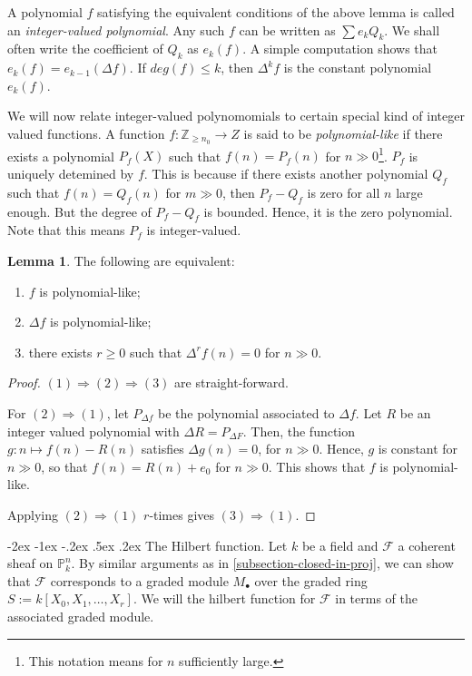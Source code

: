 \documentclass[11pt]{amsart}
\makeatletter
\renewcommand\subsection{\@startsection {subsection}{1}{\z@}%
	{-2ex \@plus -1ex \@minus -.2ex}%
	{.5ex \@plus.2ex}%
	{\normalfont\bfseries}}
\newcommand{\sF}{{\mathcal F}}
\renewcommand{\P}{{\mathbb P}}
\newcommand{\Z}{{\mathbb Z}}
\theoremstyle{definition}
\newtheorem{lemma}[theorem]{Lemma}
\makeatother
\begin{document}
A polynomial $f$ satisfying the equivalent conditions of the above lemma is called an \textit{integer-valued polynomial}. Any such $f$ can be written as $\sum e_k Q_k$. We shall often write the coefficient of $Q_k$ as $e_k(f)$. A simple computation shows that $e_k(f)= e_{k-1}(\Delta f)$. If $deg(f)\leq k$, then $\Delta^k f$ is the constant polynomial $e_k(f)$.

We will now relate integer-valued polynomomials to certain special kind of integer valued functions. A function $f:\Z_{\geq n_0}\rightarrow Z$ is said to be \textit{polynomial-like} if there exists a polynomial $P_f(X)$ such that $f(n)=P_f(n)$ for $n\gg0$\footnote{This notation means for $n$ sufficiently large.}. $P_f$ is uniquely detemined by $f$. This is because if there exists another polynomial $Q_f$ such that $f(n)=Q_f(n)$ for $m\gg 0$, then $P_f-Q_f$ is zero for all $n$ large enough. But the degree of $P_f-Q_f$ is bounded. Hence, it is the zero polynomial. Note that this means $P_f$ is integer-valued.

\begin{lemma}
	\label{lemma-polynomial-like-function}
	The following are equivalent:
	\begin{enumerate}
		\item $f$ is polynomial-like;
		\item $\Delta f$ is polynomial-like;
		\item there exists $r\geq 0$ such that $\Delta^r f(n)=0$ for $n\gg 0$.
	\end{enumerate}
\end{lemma}
\begin{proof}
	$(1)\Rightarrow (2)\Rightarrow (3)$ are straight-forward.
	
	For $(2)\Rightarrow (1)$, let $P_{\Delta f}$ be the polynomial associated to $\Delta f$. Let $R$ be an integer valued polynomial with $\Delta R= P_{\Delta F}$. Then, the function $g: n\mapsto f(n)-R(n)$ satisfies $\Delta g(n)=0$, for $n\gg 0$. Hence, $g$ is constant for $n\gg 0$, so that $f(n)=R(n)+e_0$ for $n\gg 0$. This shows that $f$ is polynomial-like.
	
	Applying $(2)\Rightarrow (1)$ $r$-times gives $(3)\Rightarrow (1)$.
\end{proof}

\subsection{The Hilbert function.}
Let $k$ be a field and $\sF$ a coherent sheaf on $\P_k^n$. By similar arguments as in \ref{subsection-closed-in-proj}, we can show that $\sF$ corresponds to a graded module $M_{\bullet}$ over the graded ring $S:= k[X_0,X_1,\ldots, X_r]$. We will the hilbert function for $\sF$ in terms of the associated graded module.
\end{document}
